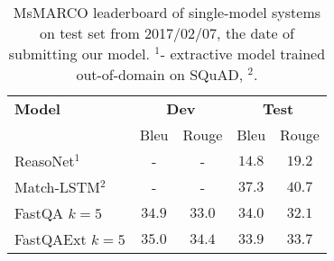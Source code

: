 \documentclass[11pt,a4paper]{article}
\begin{document}
\begin{table}[t]
    \centering
    \small
    \begin{tabular}{l c c c c}
        \toprule
        \textbf{Model} & \multicolumn{2}{c}{\textbf{Dev}} & \multicolumn{2}{c}{\textbf{Test}} \\
        & Bleu & Rouge & Bleu & Rouge \\
        \midrule
        ReasoNet$^1$ & - & - & $14.8$ & $19.2$ \\
        Match-LSTM$^2$ & - & - & $\boldsymbol{37.3}$ & $\boldsymbol{40.7}$ \\ 
        \midrule
        FastQA $k=5$ & $34.9$ & $33.0$ & $34.0$ & $32.1$  \\
        FastQAExt $k=5$ & $\boldsymbol{35.0}$ & $\boldsymbol{34.4}$ & $33.9$ & $33.7$ \\
        \bottomrule
    \end{tabular}
    \caption{MsMARCO leaderboard of single-model  systems on  test  set  from  2017/02/07,  the date  of  submitting  our  model. $^1$- extractive model trained out-of-domain on SQuAD, $^2$.}
    \label{tab:MsMARCO_results}
\end{table}
\end{document}
